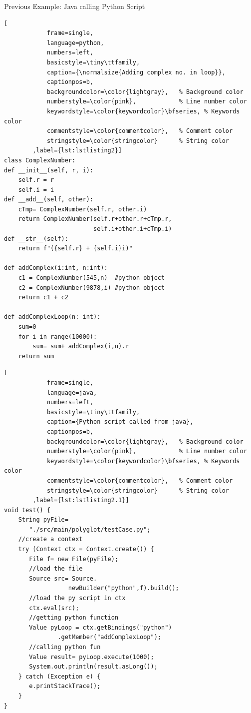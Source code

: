 \begin{frame}[fragile]{Previous Example: Java calling Python Script}
    \begin{minipage}[b]{0.45\linewidth}
        \centering
        \begin{lstlisting}[
            frame=single,
            language=python,
            numbers=left,
            basicstyle=\tiny\ttfamily,
            caption={\normalsize{Adding complex no. in loop}},
            captionpos=b,
            backgroundcolor=\color{lightgray},   % Background color
            numberstyle=\color{pink},            % Line number color
            keywordstyle=\color{keywordcolor}\bfseries, % Keywords color
            commentstyle=\color{commentcolor},   % Comment color
            stringstyle=\color{stringcolor}      % String color
        ,label={lst:lstlisting2}]
class ComplexNumber:
def __init__(self, r, i):
    self.r = r
    self.i = i
def __add__(self, other):
    cTmp= ComplexNumber(self.r, other.i)
    return ComplexNumber(self.r+other.r+cTmp.r,
                         self.i+other.i+cTmp.i)
def __str__(self):
    return f"({self.r} + {self.i}i)"

def addComplex(i:int, n:int):
    c1 = ComplexNumber(545,n)  #python object
    c2 = ComplexNumber(9878,i) #python object
    return c1 + c2

def addComplexLoop(n: int):
    sum=0
    for i in range(10000):
        sum= sum+ addComplex(i,n).r
    return sum
        \end{lstlisting}
    \end{minipage}
    \hspace{6mm}
    \begin{minipage}[b]{0.48\linewidth}
        \centering
        \begin{lstlisting}[
            frame=single,
            language=java,
            numbers=left,
            basicstyle=\tiny\ttfamily,
            caption={Python script called from java},
            captionpos=b,
            backgroundcolor=\color{lightgray},   % Background color
            numberstyle=\color{pink},            % Line number color
            keywordstyle=\color{keywordcolor}\bfseries, % Keywords color
            commentstyle=\color{commentcolor},   % Comment color
            stringstyle=\color{stringcolor}      % String color
        ,label={lst:lstlisting2.1}]
void test() {
    String pyFile=
       "./src/main/polyglot/testCase.py";
    //create a context
    try (Context ctx = Context.create()) {
       File f= new File(pyFile);
       //load the file
       Source src= Source.
                  newBuilder("python",f).build();
       //load the py script in ctx
       ctx.eval(src);
       //getting python function
       Value pyLoop = ctx.getBindings("python")
               .getMember("addComplexLoop");
       //calling python fun
       Value result= pyLoop.execute(1000);
       System.out.println(result.asLong());
    } catch (Exception e) {
       e.printStackTrace();
    }
}
        \end{lstlisting}
    \end{minipage}
\end{frame}

